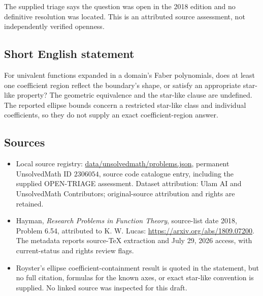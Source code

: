 \documentclass[11pt]{article}
\begin{document}
The supplied triage says the question was open in the 2018 edition and no definitive resolution was located. This is an attributed source assessment, not independently verified openness.
\subsection{Short English statement}
For univalent functions expanded in a domain's Faber polynomials, does at least one coefficient region reflect the boundary's shape, or satisfy an appropriate star-like property? The geometric equivalence and the star-like clause are undefined. The reported ellipse bounds concern a restricted star-like class and individual coefficients, so they do not supply an exact coefficient-region answer.
\subsection{Sources}
\begin{itemize}
\item Local source registry: \url{data/unsolvedmath/problems.json}, permanent UnsolvedMath ID $2306054$, source code catalogue entry, including the supplied OPEN-TRIAGE assessment. Dataset attribution: Ulam AI and UnsolvedMath Contributors; original-source attribution and rights are retained.
\item Hayman, \emph{Research Problems in Function Theory}, source-list date 2018, Problem 6.54, attributed to K. W. Lucas: \url{https://arxiv.org/abs/1809.07200}. The metadata reports source-TeX extraction and July 29, 2026 access, with current-status and rights review flags.
\item Royster's ellipse coefficient-containment result is quoted in the statement, but no full citation, formulas for the known axes, or exact star-like convention is supplied. No linked source was inspected for this draft.
\end{itemize}
\end{document}
